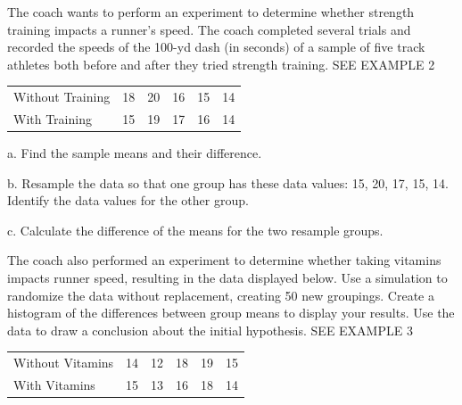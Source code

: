 \documentclass{article}
\newenvironment{practice}[2]{}{}        %
\newcommand{\answer}[1]{}               %
\newcommand{\placeholder}[2]{}          %
\newcommand{\te}[1]{}                   %
\begin{document}
\begin{practice}{13}{2}
The coach wants to perform an experiment to determine whether strength training impacts a runner's speed. The coach completed several trials and recorded the speeds of the 100-yd dash (in seconds) of a sample of five track athletes both before and after they tried strength training. SEE EXAMPLE 2
\begin{tabular}{lrrrrr}
Without Training & 18 & 20 & 16 & 15 & 14 \\
With Training & 15 & 19 & 17 & 16 & 14 \\
\end{tabular}
a. Find the sample means and their difference.
\answer{a. sample mean without vitamins: (\bar{x}=16.6); sample mean with vitamins: (\bar{x}=16.2); The difference in the sample means is (16.2-16.6=-0.4).}
\te{Printed vitamins in the answer; this item concerns training. Printed speeds in seconds; these are times.}
b. Resample the data so that one group has these data values: 15, 20, 17, 15, 14. Identify the data values for the other group.
\answer{b. 18, 19, 16, 16, 14}
c. Calculate the difference of the means for the two resample groups.
\answer{c. first sample group: (\bar{x}=16.2); second sample group: (\bar{x}=16.6); The difference in the sample means is (16.6-16.2=0.4).}
\end{practice}
\begin{practice}{14}{2}
The coach also performed an experiment to determine whether taking vitamins impacts runner speed, resulting in the data displayed below. Use a simulation to randomize the data without replacement, creating 50 new groupings. Create a histogram of the differences between group means to display your results. Use the data to draw a conclusion about the initial hypothesis. SEE EXAMPLE 3
\begin{tabular}{lrrrrr}
Without Vitamins & 14 & 12 & 18 & 19 & 15 \\
With Vitamins & 15 & 13 & 16 & 18 & 14 \\
\end{tabular}
\answer{The difference in means in the original groups is −0.4. Here is a sample histogram: In this case, it is clear that −0.4 is in an area with many other differences generated by the random samples, so you would conclude that you do not have enough evidence to support the alternative hypothesis and that the vitamins do not seem to improve times for the 100-yd dash. Since different samples will lead to different results, accept all reasonable attempts.}
\placeholder{graph}{Orange sample histogram. Horizontal Difference of Means from -4 to 4 by 1; vertical Frequency 0 to 20 by 4. Unit bins -4 to -3 through 2 to 3 labeled counts 2,5,12,15,10,4,2. Black vertical line near -0.4. No arrows.}
\end{practice}
\end{document}
